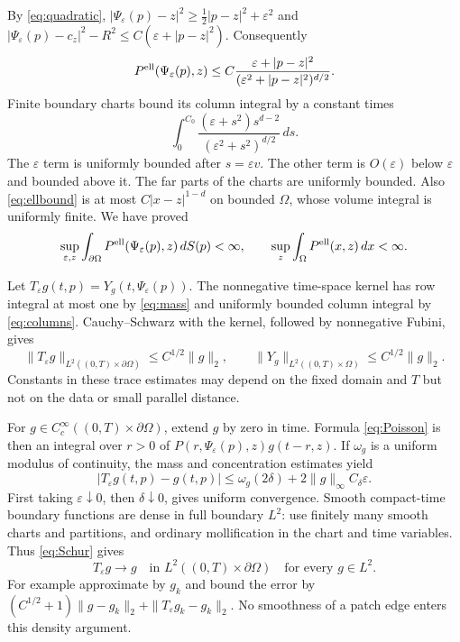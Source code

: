\documentclass[11pt]{article}
\theoremstyle{remark}
\newcommand{\Om}{\Omega}
\begin{document}
By \eqref{eq:quadratic},
$|\Psi_\varepsilon(p)-z|^2\geq\frac12|p-z|^2+\varepsilon^2$
and
$|\Psi_\varepsilon(p)-c_z|^2-R^2\leq C(\varepsilon+|p-z|^2)$.
Consequently
\[
 P^{\rm ell}(\Psi_\varepsilon(p),z)
       \leq C\frac{\varepsilon+|p-z|^2}
                          {(\varepsilon^2+|p-z|^2)^{d/2}}.
\]
Finite boundary charts bound its column integral by a constant times
\[
 \int_0^{C_0}
   \frac{(\varepsilon+s^2)s^{d-2}}
                         {(\varepsilon^2+s^2)^{d/2}}\,ds .
\]
The $\varepsilon$ term is uniformly bounded after $s=\varepsilon v$.
The other term is $O(\varepsilon)$ below $\varepsilon$ and bounded above it.
The far parts of the charts are uniformly bounded.
Also \eqref{eq:ellbound} is at most $C|x-z|^{1-d}$ on bounded $\Om$,
whose volume integral is uniformly finite.
We have proved
\begin{equation}\label{eq:columns}
 \sup_{\varepsilon,z}\int_{\partial\Om}
      P^{\rm ell}(\Psi_\varepsilon(p),z)\,dS(p)<\infty,\qquad
 \sup_z\int_\Om P^{\rm ell}(x,z)\,dx<\infty .
\end{equation}

Let $T_\varepsilon g(t,p)=Y_g(t,\Psi_\varepsilon(p))$.
The nonnegative time-space kernel has row integral at most one by
\eqref{eq:mass} and uniformly bounded column integral by
\eqref{eq:columns}.
Cauchy--Schwarz with the kernel, followed by nonnegative Fubini, gives
\begin{equation}\label{eq:Schur}
 \|T_\varepsilon g\|_{L^2((0,T)\times\partial\Om)}
       \leq C^{1/2}\|g\|_2,\qquad
 \|Y_g\|_{L^2((0,T)\times\Om)}\leq C^{1/2}\|g\|_2 .
\end{equation}
Constants in these trace estimates may depend on the fixed domain and $T$
but not on the data or small parallel distance.

For $g\in C^\infty_c((0,T)\times\partial\Om)$, extend $g$ by zero in time.
Formula \eqref{eq:Poisson} is then an integral over $r>0$ of
$P(r,\Psi_\varepsilon(p),z)g(t-r,z)$.
If $\omega_g$ is a uniform modulus of continuity, the mass and
concentration estimates yield
\[
 |T_\varepsilon g(t,p)-g(t,p)|
    \leq\omega_g(2\delta)+2\|g\|_\infty C_\delta\varepsilon .
\]
First taking $\varepsilon\downarrow0$, then $\delta\downarrow0$, gives
uniform convergence.
Smooth compact-time boundary functions are dense in full boundary $L^2$:
use finitely many smooth charts and partitions, and ordinary mollification
in the chart and time variables.
Thus \eqref{eq:Schur} gives
\begin{equation}\label{eq:strongtrace}
 T_\varepsilon g\longrightarrow g
            \quad\text{in }L^2((0,T)\times\partial\Om)
 \quad\text{for every $g\in L^2$.}
\end{equation}
For example approximate by $g_k$ and bound the error by
$(C^{1/2}+1)\|g-g_k\|_2+\|T_\varepsilon g_k-g_k\|_2$.
No smoothness of a patch edge enters this density argument.
\end{document}
